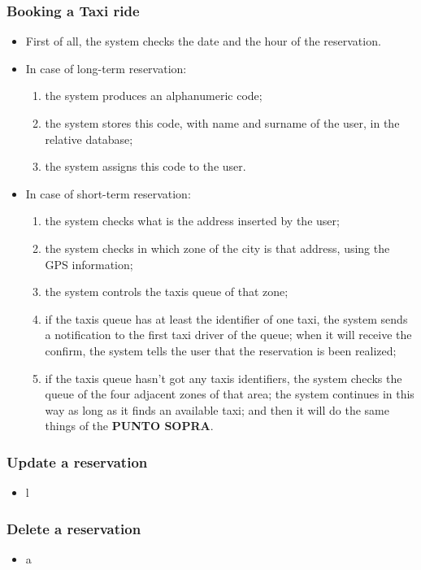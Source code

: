 		\subsubsection{Booking a Taxi ride}
		\begin{itemize}
		\item First of all, the system checks the date and the hour of the reservation. 
		\item In case of long-term reservation:
		\begin{enumerate}
		\item the system produces an alphanumeric code;
		\item the system stores this code, with name and surname of the user, in the relative database;
		\item the system assigns this code to the user.
		\end{enumerate}
		\item In case of short-term reservation:
		\begin{enumerate}
		\item the system checks what is the address inserted by the user;
		\item the system checks in which zone of the city is that address, using the GPS information;
		\item the system controls the taxis queue of that zone;
		\item if the taxis queue has at least the identifier of one taxi, the system sends a notification to the first taxi driver of the queue; when it will receive the confirm, the system tells the user that the reservation is been realized;
		\item if the taxis queue hasn't got any taxis identifiers, the system checks the queue of the four adjacent zones of that area; the system continues in this way as long as it finds an available taxi; and then it will do the same things of the \textbf {PUNTO SOPRA}.
		\end{enumerate}
		\end{itemize}
		\subsubsection{Update a reservation}
		\begin{itemize}
		\item l
		\end{itemize}
		\subsubsection{Delete a reservation}
		\begin{itemize}
		\item a
		\end{itemize}

